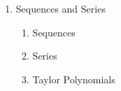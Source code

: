 \documentclass[10pt]{article}
\begin{document}
\begin{enumerate}
\item		Sequences and Series
		\begin{enumerate}
		\item		Sequences
		\item		Series
		\item		Taylor Polynomials
		\end{enumerate}

\end{enumerate}

%
%
%
%
%
%
%
%
\end{document}
